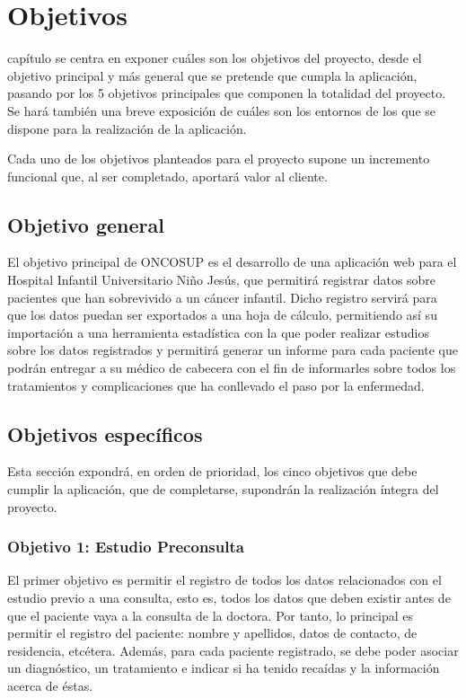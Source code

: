\chapter{Objetivos}
\label{chap:objetivos}

  capítulo se centra en exponer cuáles son los objetivos del proyecto, desde el objetivo principal y más general que se pretende que cumpla la aplicación, pasando por los 5 objetivos principales que componen la totalidad del proyecto. Se hará también una breve exposición de cuáles son los entornos de los que se dispone para la realización de la aplicación.

Cada uno de los objetivos planteados para el proyecto supone un incremento funcional que, al ser completado, aportará valor al cliente.


\section{Objetivo general}

El objetivo principal de ONCOSUP es el desarrollo de una aplicación web para el Hospital Infantil Universitario Niño Jesús, que permitirá registrar datos sobre pacientes que han sobrevivido a un cáncer infantil. Dicho registro servirá para que los datos puedan ser exportados a una hoja de cálculo, permitiendo así su importación a una herramienta estadística con la que poder realizar estudios sobre los datos registrados y permitirá generar un informe para cada paciente que podrán entregar a su médico de cabecera con el fin de informarles sobre todos los tratamientos y complicaciones que ha conllevado el paso por la enfermedad.


\section{Objetivos específicos}
\label{sec:ObjetivosEspecíficos}

Esta sección expondrá, en orden de prioridad, los cinco objetivos que debe cumplir la aplicación, que de completarse, supondrán la realización íntegra del proyecto.

\subsection{Objetivo 1: Estudio Preconsulta}

El primer objetivo es permitir el registro de todos los datos relacionados con el estudio previo a una consulta, esto es, todos los datos que deben existir antes de que el paciente vaya a la consulta de la doctora. Por tanto, lo principal es permitir el registro del paciente: nombre y apellidos, datos de contacto, de residencia, etcétera. Además, para cada paciente registrado, se debe poder asociar un diagnóstico, un tratamiento e indicar si ha tenido recaídas y la información acerca de éstas. 

